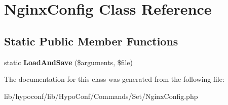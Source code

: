 \hypertarget{class_hypo_conf_1_1_commands_1_1_set_1_1_nginx_config}{
\section{\-Nginx\-Config \-Class \-Reference}
\label{class_hypo_conf_1_1_commands_1_1_set_1_1_nginx_config}
}
\subsection*{\-Static \-Public \-Member \-Functions}
\begin{DoxyCompactItemize}
\item 
\hypertarget{class_hypo_conf_1_1_commands_1_1_set_1_1_nginx_config_a5f8c13cc341cefb70df0b404750a5c6b}{
static {\bfseries \-Load\-And\-Save} (\$arguments, \$file)}
\label{class_hypo_conf_1_1_commands_1_1_set_1_1_nginx_config_a5f8c13cc341cefb70df0b404750a5c6b}

\end{DoxyCompactItemize}


\-The documentation for this class was generated from the following file\-:\begin{DoxyCompactItemize}
\item 
lib/hypoconf/lib/\-Hypo\-Conf/\-Commands/\-Set/\-Nginx\-Config.\-php\end{DoxyCompactItemize}
